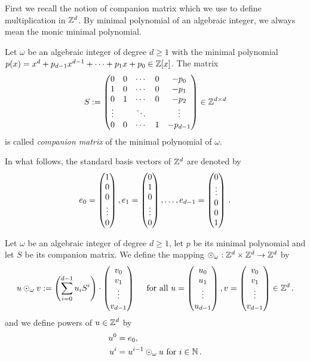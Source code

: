 First we recall the notion of companion matrix which we use to define multiplication in $\mathbb{Z}^d$. By minimal polynomial of an algebraic integer, we always mean the monic minimal polynomial.  
\begin{defn}
Let $\omega$ be an algebraic integer of degree $d\geq 1$ with the  minimal polynomial $p(x)=x^d +p_{d-1}x^{d-1}+ \cdots + p_1 x+p_0 \in \mathbb{Z}[x]$. The matrix 
$$
S := \begin{pmatrix}
            0 & 0 & \cdots & 0 & -p_0 \\
            1 & 0 & \cdots & 0 & -p_1 \\
            0 & 1 & \cdots & 0 & -p_2 \\
            \vdots &   & \ddots & & \vdots \\
            0 & 0 & \cdots & 1 & -p_{d-1} 
            \end{pmatrix} \in \mathbb{Z}^{d\times d}
$$
is called \emph{companion matrix} of the minimal polynomial of $\omega$.
\end{defn}
In what follows, the standard basis vectors of $\mathbb{Z}^d$  are denoted by 
$$
e_0=\begin{pmatrix}
              1 \\
              0 \\
              0 \\
              \vdots \\
              0
              \end{pmatrix}, \\
e_1=\begin{pmatrix}
              0 \\
              1 \\
              0 \\
              \vdots \\
              0
              \end{pmatrix}, \dots ,\\
e_{d-1}=\begin{pmatrix}
              0 \\        
              \vdots \\
              0 \\
              0\\
              1
              \end{pmatrix}\,.             
$$

\begin{defn}
Let $\omega$ be an algebraic integer of degree $d\geq 1$, let $p$ be its minimal polynomial and let $S$ be its companion matrix. We define the mapping $\odot_\omega: \mathbb{Z}^d \times \mathbb{Z}^d \rightarrow \mathbb{Z}^d$ by 
$$
u \odot_\omega v := \left(\sum_{i=0}^{d-1} {u}_i S^i\right)\cdot \begin{pmatrix} {v}_0 \\ {v}_1 \\ \vdots \\ {v}_{d-1} \end{pmatrix} \quad \text{ for all } u=\begin{pmatrix} {u}_0 \\ {u}_1 \\ \vdots \\ {u}_{d-1} \end{pmatrix}, v=\begin{pmatrix} {v}_0 \\ {v}_1 \\ \vdots \\ {v}_{d-1} \end{pmatrix} \in \mathbb{Z}^d\,.
$$ 
and we define powers of $u \in \mathbb{Z}^d$ by
\begin{align*}
    u^0&=e_0, \\
    u^{i}&= u^{i-1} \odot_\omega u \text{ for } i\in\mathbb{N}\,.
\end{align*}
\end{defn}

